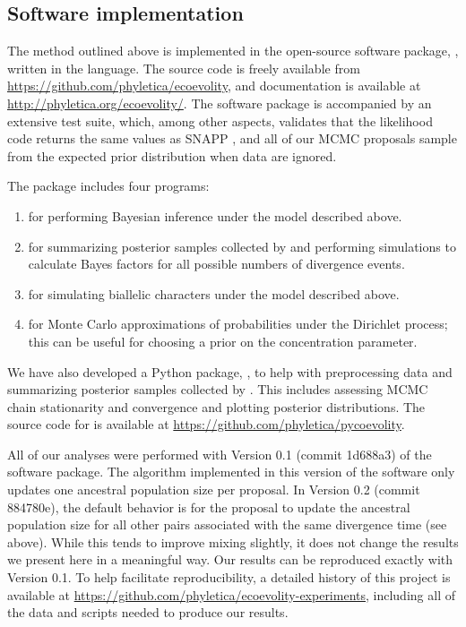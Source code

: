 \subsection{Software implementation}
The method outlined above is implemented in the open-source software package,
\ecoevolity, written in the \cpp language.
The source code is freely available from
\url{https://github.com/phyletica/ecoevolity}, and documentation is available
at
\url{http://phyletica.org/ecoevolity/}.
The software package is accompanied by an extensive test suite, which, among
other aspects,
validates that the likelihood code returns the same values
as
SNAPP \citep{Bryant2012},
and all of our MCMC proposals sample from the expected prior distribution
when data are ignored.

The \ecoevolity package includes four programs:
\begin{enumerate}
    \item \ecoevolity for performing Bayesian inference under the
        model described above.
    \item \sumcoevolity for summarizing posterior samples collected by
        \ecoevolity and performing simulations to calculate Bayes factors for
        all possible numbers of divergence events.
    \item \simcoevolity for simulating biallelic characters under the model
        described above.
    \item \dpprobs for Monte Carlo approximations of probabilities under the
        Dirichlet process; this can be useful for choosing a prior on the
        concentration parameter.
\end{enumerate}
We have also developed a Python package, \pycoevolity, to help with
preprocessing data and summarizing posterior samples collected by \ecoevolity.
This includes assessing MCMC chain stationarity and convergence and plotting
posterior distributions.
The source code for \pycoevolity is available at
\url{https://github.com/phyletica/pycoevolity}.

All of our analyses were performed with
Version 0.1 
(commit 1d688a3)
of the \ecoevolity software package.
The \timerootsizemixer algorithm implemented in this version of the software
only updates one ancestral population size per proposal.
In Version 0.2 (commit 884780e), the default behavior is for the
\timerootsizemixer proposal to update the ancestral population size for all
other pairs associated with the same divergence time (see above).
While this tends to improve mixing slightly, it does not change the results we
present here in a meaningful way.
Our results can be reproduced exactly with Version 0.1.
To help facilitate reproducibility, a detailed history of this
project is available at
\url{https://github.com/phyletica/ecoevolity-experiments},
including all of the data and scripts needed to produce our results.


